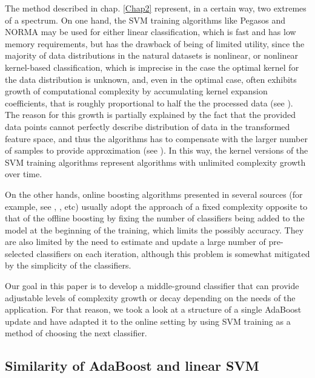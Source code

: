 The method described in chap. \ref{Chap2} represent, in a certain way, two extremes of a spectrum. On one hand, the SVM training algorithms like Pegasos and NORMA may be used for either linear classification, which is fast and has low memory requirements, but has the drawback of being of limited utility, since the majority of data distributions in the natural datasets is nonlinear, or nonlinear kernel-based classification, which is imprecise in the case the optimal kernel for the data distribution is unknown, and, even in the optimal case, often exhibits growth of computational complexity by accumulating kernel expansion coefficients, that is roughly proportional to half the the processed data (see ). The reason for this growth is partially explained by the fact that the provided data points cannot perfectly describe distribution of data in the transformed feature space, and thus the algorithms has to compensate with the larger number of samples to provide approximation (see ). In this way, the kernel versions of the SVM training algorithms represent algorithms with unlimited complexity growth over time.

On the other hands, online boosting algorithms presented in several sources (for example, see \cite{grabner2008}, \cite{chang}, etc) usually adopt the approach of a fixed complexity opposite to that of the offline boosting by fixing the number of classifiers being added to the model at the beginning of the training, which limits the possibly accuracy. They are also limited by the need to estimate and update a large number of pre-selected classifiers on each iteration, although this problem is somewhat mitigated by the simplicity of the classifiers.

Our goal in this paper is to develop a middle-ground classifier that can provide adjustable levels of complexity growth or decay depending on the needs of the application. For that reason, we took a look at a structure of a single AdaBoost update and have adapted it to the online setting by using SVM training as a method of choosing the next classifier.

\subsection{Similarity of AdaBoost and linear SVM}

